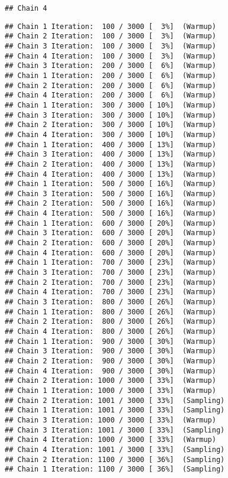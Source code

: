 \documentclass[
]{article}
\begin{document}
\begin{verbatim}
## Chain 4
\end{verbatim}

\begin{verbatim}
## Chain 1 Iteration:  100 / 3000 [  3%]  (Warmup) 
## Chain 2 Iteration:  100 / 3000 [  3%]  (Warmup) 
## Chain 3 Iteration:  100 / 3000 [  3%]  (Warmup) 
## Chain 4 Iteration:  100 / 3000 [  3%]  (Warmup) 
## Chain 3 Iteration:  200 / 3000 [  6%]  (Warmup) 
## Chain 1 Iteration:  200 / 3000 [  6%]  (Warmup) 
## Chain 2 Iteration:  200 / 3000 [  6%]  (Warmup) 
## Chain 4 Iteration:  200 / 3000 [  6%]  (Warmup) 
## Chain 1 Iteration:  300 / 3000 [ 10%]  (Warmup) 
## Chain 3 Iteration:  300 / 3000 [ 10%]  (Warmup) 
## Chain 2 Iteration:  300 / 3000 [ 10%]  (Warmup) 
## Chain 4 Iteration:  300 / 3000 [ 10%]  (Warmup) 
## Chain 1 Iteration:  400 / 3000 [ 13%]  (Warmup) 
## Chain 3 Iteration:  400 / 3000 [ 13%]  (Warmup) 
## Chain 2 Iteration:  400 / 3000 [ 13%]  (Warmup) 
## Chain 4 Iteration:  400 / 3000 [ 13%]  (Warmup) 
## Chain 1 Iteration:  500 / 3000 [ 16%]  (Warmup) 
## Chain 3 Iteration:  500 / 3000 [ 16%]  (Warmup) 
## Chain 2 Iteration:  500 / 3000 [ 16%]  (Warmup) 
## Chain 4 Iteration:  500 / 3000 [ 16%]  (Warmup) 
## Chain 1 Iteration:  600 / 3000 [ 20%]  (Warmup) 
## Chain 3 Iteration:  600 / 3000 [ 20%]  (Warmup) 
## Chain 2 Iteration:  600 / 3000 [ 20%]  (Warmup) 
## Chain 4 Iteration:  600 / 3000 [ 20%]  (Warmup) 
## Chain 1 Iteration:  700 / 3000 [ 23%]  (Warmup) 
## Chain 3 Iteration:  700 / 3000 [ 23%]  (Warmup) 
## Chain 2 Iteration:  700 / 3000 [ 23%]  (Warmup) 
## Chain 4 Iteration:  700 / 3000 [ 23%]  (Warmup) 
## Chain 3 Iteration:  800 / 3000 [ 26%]  (Warmup) 
## Chain 1 Iteration:  800 / 3000 [ 26%]  (Warmup) 
## Chain 2 Iteration:  800 / 3000 [ 26%]  (Warmup) 
## Chain 4 Iteration:  800 / 3000 [ 26%]  (Warmup) 
## Chain 1 Iteration:  900 / 3000 [ 30%]  (Warmup) 
## Chain 3 Iteration:  900 / 3000 [ 30%]  (Warmup) 
## Chain 2 Iteration:  900 / 3000 [ 30%]  (Warmup) 
## Chain 4 Iteration:  900 / 3000 [ 30%]  (Warmup) 
## Chain 2 Iteration: 1000 / 3000 [ 33%]  (Warmup) 
## Chain 1 Iteration: 1000 / 3000 [ 33%]  (Warmup) 
## Chain 2 Iteration: 1001 / 3000 [ 33%]  (Sampling) 
## Chain 1 Iteration: 1001 / 3000 [ 33%]  (Sampling) 
## Chain 3 Iteration: 1000 / 3000 [ 33%]  (Warmup) 
## Chain 3 Iteration: 1001 / 3000 [ 33%]  (Sampling) 
## Chain 4 Iteration: 1000 / 3000 [ 33%]  (Warmup) 
## Chain 4 Iteration: 1001 / 3000 [ 33%]  (Sampling) 
## Chain 2 Iteration: 1100 / 3000 [ 36%]  (Sampling) 
## Chain 1 Iteration: 1100 / 3000 [ 36%]  (Sampling) 

\end{verbatim}
\end{document}
